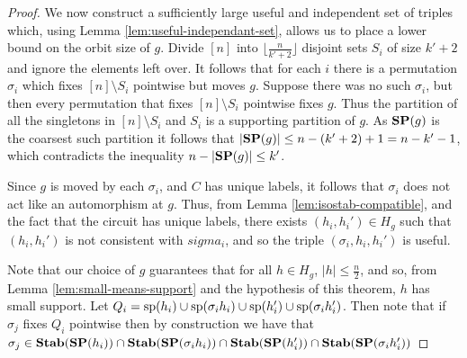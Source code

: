 \documentclass[../paper.tex]{subfiles}
\begin{document}
\begin{proof}
  We now construct a sufficiently large useful and independent set of triples
  which, using Lemma \ref{lem:useful-independant-set}, allows us to place a
  lower bound on the orbit size of $g$. Divide $[n]$ into $\lfloor \frac{n}{k' +
    2} \rfloor$ disjoint sets $S_i$ of size $k' + 2$ and ignore the elements
  left over. It follows that for each $i$ there is a permutation $\sigma_i$
  which fixes $[n] \setminus S_i$ pointwise but moves $g$. Suppose there was no
  such $\sigma_i$, but then every permutation that fixes $[n]\setminus S_i$
  pointwise fixes $g$. Thus the partition of all the singletons in $[n]\setminus
  S_i$ and $S_i$ is a supporting partition of $g$. As $\text{\textbf{SP}}(g)$ is the coarsest
  such partition it follows that $\vert \text{\textbf{SP}}(g) \vert \leq n - (k'+2) + 1 = n -
  k' - 1$, which contradicts the inequality $n - \vert \text{\textbf{SP}}(g) \vert \leq k'$.

  Since $g$ is moved by each $\sigma_i$, and $C$ has unique labels, it follows
  that $\sigma_i$ does not act like an automorphism at $g$. Thus, from Lemma
  \ref{lem:isostab-compatible}, and the fact that the circuit has unique labels,
  there exists $(h_i, h_i') \in H_g$ such that $(h_i, h_i')$ is not consistent
  with $sigma_i$, and so the triple $(\sigma_i, h_i, h_i')$ is useful.

  Note that our choice of $g$ guarantees that for all $h \in H_g$, $\vert h
  \vert \leq \frac{n}{2}$, and so, from Lemma \ref{lem:small-means-support} and
  the hypothesis of this theorem, $h$ has small support. Let $Q_i = \text{sp}(h_i)
  \cup \text{sp}(\sigma_i h_i) \cup \text{sp}(h_i') \cup \text{sp}(\sigma_i h_i')$. Then
  note that if $\sigma_j$ fixes $Q_i$ pointwise then by construction we have
  that $\sigma_j \in \text{\textbf{Stab}}(\text{\textbf{SP}}(h_i)) \cap \text{\textbf{Stab}}(\text{\textbf{SP}}(\sigma_i h_i)) \cap
  \text{\textbf{Stab}}(\text{\textbf{SP}}(h_i')) \cap \text{\textbf{Stab}}(\text{\textbf{SP}}(\sigma_i h_i'))$


\end{proof}
\end{document}
